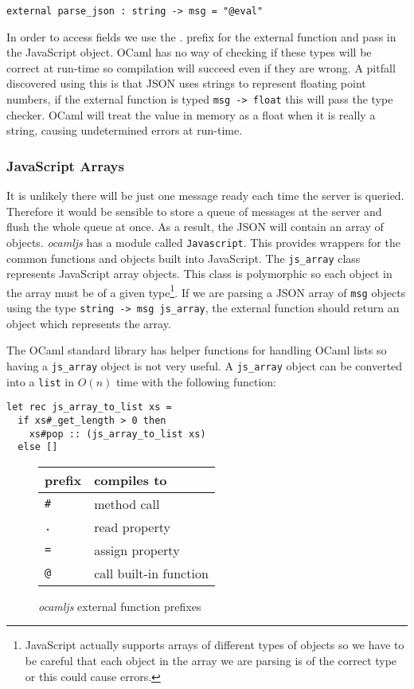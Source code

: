 \begin{center}
\texttt{external parse\_json : string -> msg = "@eval"}
\end{center}

In order to access fields we use the \emph{.} prefix for the external function and pass in the JavaScript object. OCaml has no way of checking if these types will be correct at run-time so compilation will succeed even if they are wrong. \label{lab:json-pitfall}A pitfall discovered using this is that JSON uses strings to represent floating point numbers, if the external function is typed \texttt{msg -> float} this will pass the type checker. OCaml will treat the value in memory as a float when it is really a string, causing undetermined errors at run-time.

\subsubsection{JavaScript Arrays}
It is unlikely there will be just one message ready each time the server is queried. Therefore it would be sensible to store a queue of messages at the server and flush the whole queue at once. As a result, the JSON will contain an array of objects. \emph{ocamljs} has a module called \texttt{Javascript}\label{lab:javascript}. This provides wrappers for the common functions and objects built into JavaScript. The \texttt{js\_array} class represents JavaScript array objects. This class is polymorphic so each object in the array must be of a given type\footnote{JavaScript actually supports arrays of different types of objects so we have to be careful that each object in the array we are parsing is of the correct type or this could cause errors.}. If we are parsing a JSON array of \texttt{msg} objects using the type \texttt{string -> msg js\_array}, the external function should return an object which represents the array.

The OCaml standard library has helper functions for handling OCaml lists so having a \texttt{js\_array} object is not very useful. A \texttt{js\_array} object can be converted into a \texttt{list} in \texttt{$O(n)$} time with the following function:
\vfill\pagebreak
\begin{lstlisting}[caption={Converting a \texttt{js\_array} to an OCaml \texttt{list}}]
let rec js_array_to_list xs =
  if xs#_get_length > 0 then
    xs#pop :: (js_array_to_list xs)
  else []
\end{lstlisting}

\begin{figure}
  \centering
  \begin{tabular}{|l|l|}
    \hline
    \textbf{prefix} & \textbf{compiles to}\\ \hline
    \texttt{\#} & method call\\ \hline
    \texttt{.} & read property\\ \hline
    \texttt{=} & assign property\\ \hline
    \texttt{@} & call built-in function\\ \hline
  \end{tabular}
  \caption{\emph{ocamljs} external function prefixes}
  \label{external}
\end{figure}

